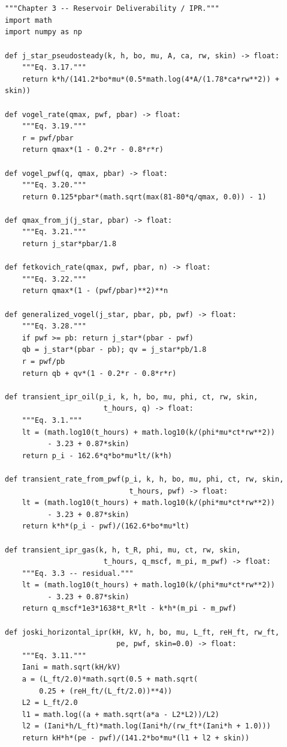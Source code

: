 \documentclass[10pt,a4paper,openany]{book}
\begin{document}
\chapter{}
\begin{lstlisting}
"""Chapter 3 -- Reservoir Deliverability / IPR."""
import math
import numpy as np

def j_star_pseudosteady(k, h, bo, mu, A, ca, rw, skin) -> float:
    """Eq. 3.17."""
    return k*h/(141.2*bo*mu*(0.5*math.log(4*A/(1.78*ca*rw**2)) + skin))

def vogel_rate(qmax, pwf, pbar) -> float:
    """Eq. 3.19."""
    r = pwf/pbar
    return qmax*(1 - 0.2*r - 0.8*r*r)

def vogel_pwf(q, qmax, pbar) -> float:
    """Eq. 3.20."""
    return 0.125*pbar*(math.sqrt(max(81-80*q/qmax, 0.0)) - 1)

def qmax_from_j(j_star, pbar) -> float:
    """Eq. 3.21."""
    return j_star*pbar/1.8

def fetkovich_rate(qmax, pwf, pbar, n) -> float:
    """Eq. 3.22."""
    return qmax*(1 - (pwf/pbar)**2)**n

def generalized_vogel(j_star, pbar, pb, pwf) -> float:
    """Eq. 3.28."""
    if pwf >= pb: return j_star*(pbar - pwf)
    qb = j_star*(pbar - pb); qv = j_star*pb/1.8
    r = pwf/pb
    return qb + qv*(1 - 0.2*r - 0.8*r*r)

def transient_ipr_oil(p_i, k, h, bo, mu, phi, ct, rw, skin,
                       t_hours, q) -> float:
    """Eq. 3.1."""
    lt = (math.log10(t_hours) + math.log10(k/(phi*mu*ct*rw**2))
          - 3.23 + 0.87*skin)
    return p_i - 162.6*q*bo*mu*lt/(k*h)

def transient_rate_from_pwf(p_i, k, h, bo, mu, phi, ct, rw, skin,
                             t_hours, pwf) -> float:
    lt = (math.log10(t_hours) + math.log10(k/(phi*mu*ct*rw**2))
          - 3.23 + 0.87*skin)
    return k*h*(p_i - pwf)/(162.6*bo*mu*lt)

def transient_ipr_gas(k, h, t_R, phi, mu, ct, rw, skin,
                       t_hours, q_mscf, m_pi, m_pwf) -> float:
    """Eq. 3.3 -- residual."""
    lt = (math.log10(t_hours) + math.log10(k/(phi*mu*ct*rw**2))
          - 3.23 + 0.87*skin)
    return q_mscf*1e3*1638*t_R*lt - k*h*(m_pi - m_pwf)

def joski_horizontal_ipr(kH, kV, h, bo, mu, L_ft, reH_ft, rw_ft,
                          pe, pwf, skin=0.0) -> float:
    """Eq. 3.11."""
    Iani = math.sqrt(kH/kV)
    a = (L_ft/2.0)*math.sqrt(0.5 + math.sqrt(
        0.25 + (reH_ft/(L_ft/2.0))**4))
    L2 = L_ft/2.0
    l1 = math.log((a + math.sqrt(a*a - L2*L2))/L2)
    l2 = (Iani*h/L_ft)*math.log(Iani*h/(rw_ft*(Iani*h + 1.0)))
    return kH*h*(pe - pwf)/(141.2*bo*mu*(l1 + l2 + skin))


\end{lstlisting}
\end{document}
